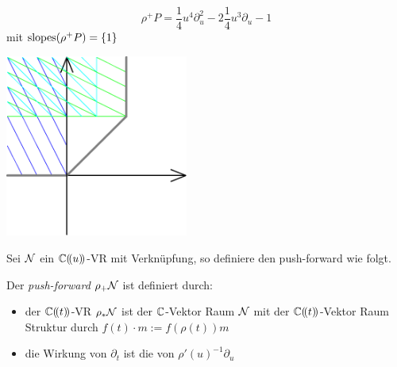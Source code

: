 \begin{exmp}
  \begin{minipage}[hbt]{0,39\textwidth}
    \[ \rho^+P= \frac{1}{4}u^4\partial_u^2 -2\frac{1}{4}u^3\partial_u-1 \]
    mit $ \operatorname{slopes}(\rho^+P)=\{1\} $
  \end{minipage}
  \begin{minipage}[hbt]{0,59\textwidth}
    \begin{center}
      \includegraphics[width=6cm]{img/formal_b_pb.png}
    \end{center}
  \end{minipage}
\end{exmp}

Sei $\mathcal{N}$ ein $\mathbb{C}(\!(u)\!)$-VR mit Verknüpfung, so definiere den push-forward
wie folgt.
\begin{defn}
  \cite[1.a]{sabbah_Fourier-local}
  Der \emph{push-forward} $\rho_+\mathcal{N}$ ist definiert durch:
  \begin{itemize}
    \item der $\mathbb{C}(\!(t)\!)$-VR $\rho_*\mathcal{N}$ ist der $\mathbb{C}$-Vektor Raum $\mathcal{N}$ mit
      der $\mathbb{C}(\!(t)\!)$-Vektor Raum Struktur durch $f(t)\cdot m:=f(\rho(t))m$
    \item die Wirkung von $\partial_t$ ist die von $\rho'(u)^{-1}\partial_u$
  \end{itemize}
\end{defn}

